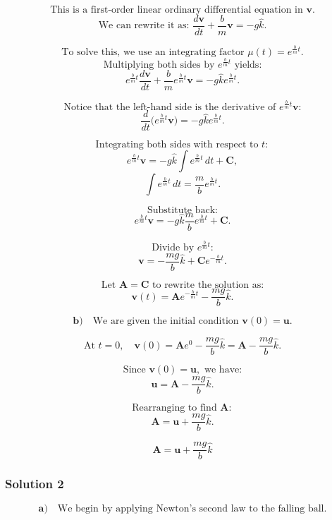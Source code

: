 \documentclass{article}
\begin{document}
\[
\text{This is a first-order linear ordinary differential equation in } \mathbf{v} \text{.}
\]
\[
\text{We can rewrite it as: } \frac{d\mathbf{v}}{dt} + \frac{b}{m}\mathbf{v} = -g \hat{k}.
\]

\[
\text{To solve this, we use an integrating factor } \mu(t) = e^{\frac{b}{m}t}.
\]
\[
\text{Multiplying both sides by } e^{\frac{b}{m}t} \text{ yields:}
\]
\[
e^{\frac{b}{m}t}\frac{d\mathbf{v}}{dt} + \frac{b}{m}e^{\frac{b}{m}t}\mathbf{v} = -g \hat{k} e^{\frac{b}{m}t}.
\]

\[
\text{Notice that the left-hand side is the derivative of } e^{\frac{b}{m}t}\mathbf{v} \text{:}
\]
\[
\frac{d}{dt}\bigl(e^{\frac{b}{m}t}\mathbf{v}\bigr) = -g \hat{k} e^{\frac{b}{m}t}.
\]

\[
\text{Integrating both sides with respect to } t:
\]
\[
e^{\frac{b}{m}t}\mathbf{v} = -g \hat{k} \int e^{\frac{b}{m}t} \, dt + \mathbf{C},
\]
\[
\int e^{\frac{b}{m}t} \, dt = \frac{m}{b} e^{\frac{b}{m}t}.
\]

\[
\text{Substitute back:}
\]
\[
e^{\frac{b}{m}t}\mathbf{v} = -g \hat{k} \frac{m}{b} e^{\frac{b}{m}t} + \mathbf{C}.
\]

\[
\text{Divide by } e^{\frac{b}{m}t} \text{:}
\]
\[
\mathbf{v} = - \frac{mg}{b} \hat{k} + \mathbf{C} e^{-\frac{b}{m}t}.
\]

\[
\text{Let } \mathbf{A} = \mathbf{C} \text{ to rewrite the solution as:}
\]
\[
\mathbf{v}(t) = \mathbf{A} e^{-\frac{b}{m}t} - \frac{mg}{b}\hat{k}.
\]

\[
\textbf{b)}\quad \text{We are given the initial condition } \mathbf{v}(0) = \mathbf{u}. 
\]

\[
\text{At } t=0, \quad \mathbf{v}(0) = \mathbf{A} e^0 - \frac{mg}{b}\hat{k} = \mathbf{A} - \frac{mg}{b}\hat{k}.
\]

\[
\text{Since } \mathbf{v}(0) = \mathbf{u}, \text{ we have:}
\]
\[
\mathbf{u} = \mathbf{A} - \frac{mg}{b}\hat{k}.
\]

\[
\text{Rearranging to find } \mathbf{A}:
\]
\[
\mathbf{A} = \mathbf{u} + \frac{mg}{b}\hat{k}.
\]

\[
\boxed{\mathbf{A} = \mathbf{u} + \frac{mg}{b}\hat{k}}
\]

\subsubsection{Solution 2}

\[
\textbf{a)}\quad \text{We begin by applying Newton's second law to the falling ball.}
\]
\end{document}
